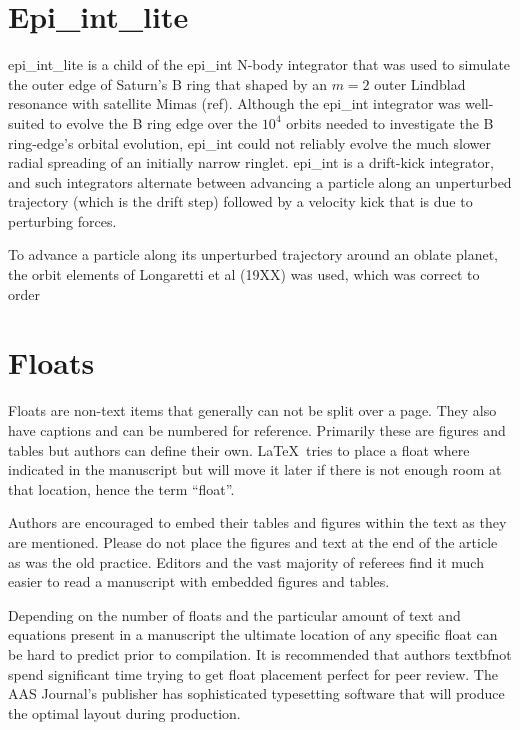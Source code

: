 \documentclass[preprint]{aastex62}
\newcommand\latex{La\TeX}
\begin{document}
\section{Epi\_int\_lite} \label{sec:epi_int_lite}

epi\_int\_lite is a child of the epi\_int N-body integrator that was used to
simulate the outer edge of Saturn's B ring that shaped by an $m=2$ outer Lindblad resonance
with satellite Mimas (ref). Although the epi\_int integrator was well-suited to evolve the
B ring edge over the $10^4$ orbits needed to investigate the B ring-edge's orbital evolution,
epi\_int could not reliably evolve the much slower radial spreading of an initially narrow
ringlet. epi\_int is a drift-kick integrator, and such integrators alternate between
advancing a particle along an unperturbed trajectory (which is the drift step) followed
by a velocity kick that is due to perturbing forces. 

To advance a particle along its unperturbed
trajectory around an oblate planet, the orbit elements of Longaretti et al (19XX) was used,
which was correct to order 

\section{Floats} \label{sec:floats}

Floats are non-text items that generally can not be split over a page.
They also have captions and can be numbered for reference.  Primarily these
are figures and tables but authors can define their own. \latex\ tries to
place a float where indicated in the manuscript but will move it later if
there is not enough room at that location, hence the term ``float''.

Authors are encouraged to embed their tables and figures within the text as
they are mentioned.  Please do not place the figures and text at the end of
the article as was the old practice.  Editors and the vast majority of
referees find it much easier to read a manuscript with embedded figures and
tables.

Depending on the number of floats and the particular amount of text and
equations present in a manuscript the ultimate location of any specific
float can be hard to predict prior to compilation. It is recommended that
authors textbf{not} spend significant time trying to get float placement
perfect for peer review.  The AAS Journal's publisher has sophisticated
typesetting software that will produce the optimal layout during
production.
\end{document}
